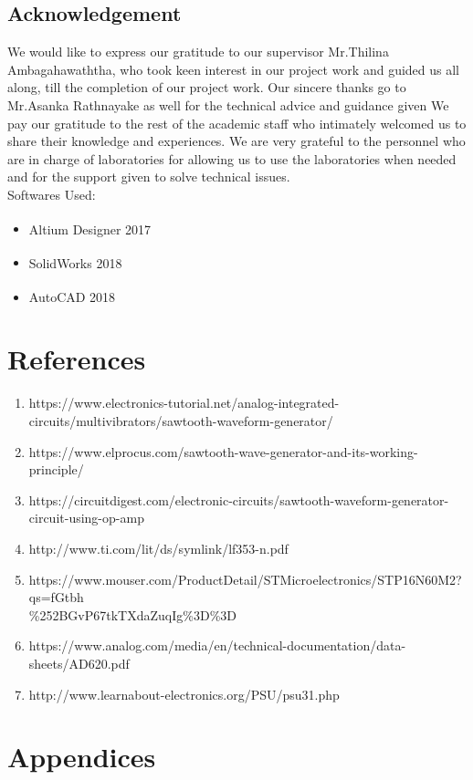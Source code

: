 \documentclass[a4paper,12pt]{article}
\begin{document}
\begin{multicols}{2}
\section{Acknowledgement}
We would like to express our gratitude to our supervisor Mr.Thilina Ambagahawaththa, who took keen interest in our project work and guided us all along, till the completion of our project work. Our sincere thanks go to Mr.Asanka Rathnayake as well for the technical advice and guidance given
We pay our gratitude to the rest of the academic staff who intimately welcomed us to share their knowledge and experiences. We are very grateful to the personnel who are in charge of laboratories for allowing us to use the laboratories when needed and for the support given to solve technical issues.\\
Softwares Used:
\begin{itemize}
    \item Altium Designer\textsuperscript{\textregistered} 2017
    \item SolidWorks\textsuperscript{\textregistered} 2018
    \item AutoCAD\textsuperscript{\textregistered} 2018
\end{itemize}
\end{multicols}
\section{References}
\begin{enumerate}
    \item https://www.electronics-tutorial.net/analog-integrated-circuits/multivibrators/sawtooth-waveform-generator/
    \item https://www.elprocus.com/sawtooth-wave-generator-and-its-working-principle/
    \item https://circuitdigest.com/electronic-circuits/sawtooth-waveform-generator-circuit-using-op-amp
    \item http://www.ti.com/lit/ds/symlink/lf353-n.pdf
    \item https://www.mouser.com/ProductDetail/STMicroelectronics/STP16N60M2?qs=fGtbh\\\%252BGvP67tkTXdaZuqIg\%3D\%3D
    \item https://www.analog.com/media/en/technical-documentation/data-sheets/AD620.pdf
    \item http://www.learnabout-electronics.org/PSU/psu31.php
\end{enumerate}
\newpage
\section{Appendices}
\end{document}
